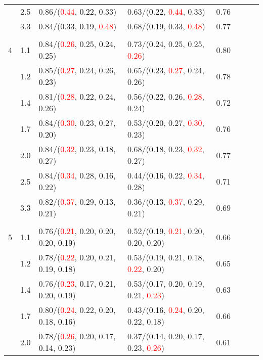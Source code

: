 \documentclass[10pt,a4paper]{report}
\begin{document}
\begin{table}[!htbp]
\begin{center}
{\begin{tabular}{ccllcccc}
			&2.5&0.86/(\textcolor{red}{0.44}, \textcolor{black}{0.22}, 0.33)&0.63/(\textcolor{black}{0.22}, \textcolor{red}{0.44}, 0.33)&0.76\\
			&3.3&0.84/(0.33, \textcolor{black}{0.19}, \textcolor{red}{0.48})&0.68/(\textcolor{black}{0.19}, 0.33, \textcolor{red}{0.48})&0.77\\
			&&&&\\
			4			&1.1&0.84/(\textcolor{red}{0.26}, 0.25, \textcolor{black}{0.24}, 0.25)&0.73/(\textcolor{black}{0.24}, 0.25, 0.25, \textcolor{red}{0.26})&0.80\\
			&1.2&0.85/(\textcolor{red}{0.27}, 0.24, 0.26, \textcolor{black}{0.23})&0.65/(\textcolor{black}{0.23}, \textcolor{red}{0.27}, 0.24, 0.26)&0.78\\
			&1.4&0.81/(\textcolor{red}{0.28}, \textcolor{black}{0.22}, 0.24, 0.26)&0.56/(\textcolor{black}{0.22}, 0.26, \textcolor{red}{0.28}, 0.24)&0.72\\
			&1.7&0.84/(\textcolor{red}{0.30}, 0.23, 0.27, \textcolor{black}{0.20})&0.53/(\textcolor{black}{0.20}, 0.27, \textcolor{red}{0.30}, 0.23)&0.76\\
			&2.0&0.84/(\textcolor{red}{0.32}, 0.23, \textcolor{black}{0.18}, 0.27)&0.68/(\textcolor{black}{0.18}, 0.23, \textcolor{red}{0.32}, 0.27)&0.77\\
			&2.5&0.84/(\textcolor{red}{0.34}, 0.28, \textcolor{black}{0.16}, 0.22)&0.44/(\textcolor{black}{0.16}, 0.22, \textcolor{red}{0.34}, 0.28)&0.71\\
			&3.3&0.82/(\textcolor{red}{0.37}, 0.29, \textcolor{black}{0.13}, 0.21)&0.36/(\textcolor{black}{0.13}, \textcolor{red}{0.37}, 0.29, 0.21)&0.69\\
			&&&&\\
			5			&1.1&0.76/(\textcolor{red}{0.21}, 0.20, 0.20, 0.20, \textcolor{black}{0.19})&0.52/(\textcolor{black}{0.19}, \textcolor{red}{0.21}, 0.20, 0.20, 0.20)&0.66\\
			&1.2&0.78/(\textcolor{red}{0.22}, 0.20, 0.21, 0.19, \textcolor{black}{0.18})&0.53/(0.19, 0.21, \textcolor{black}{0.18}, \textcolor{red}{0.22}, 0.20)&0.65\\
			&1.4&0.76/(\textcolor{red}{0.23}, \textcolor{black}{0.17}, 0.21, 0.20, 0.19)&0.53/(\textcolor{black}{0.17}, 0.20, 0.19, 0.21, \textcolor{red}{0.23})&0.63\\
			&1.7&0.80/(\textcolor{red}{0.24}, 0.22, 0.20, 0.18, \textcolor{black}{0.16})&0.43/(\textcolor{black}{0.16}, \textcolor{red}{0.24}, 0.20, 0.22, 0.18)&0.66\\
			&2.0&0.78/(\textcolor{red}{0.26}, 0.20, 0.17, \textcolor{black}{0.14}, 0.23)&0.37/(\textcolor{black}{0.14}, 0.20, 0.17, 0.23, \textcolor{red}{0.26})&0.61\\

\end{tabular}}
\end{center}
\end{table}
\end{document}
